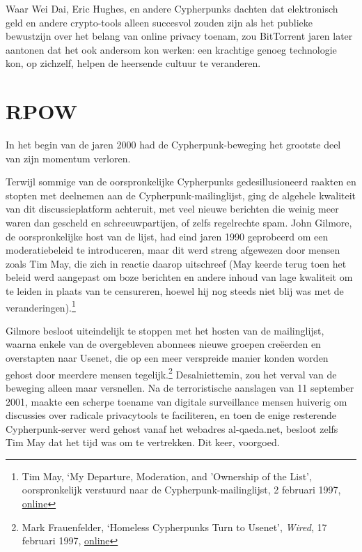 \documentclass[
  a5paper,
  smalldemyvopaper,11pt,twoside,onecolumn,openright,extrafontsizes]{memoir}
\begin{document}
Waar Wei Dai, Eric Hughes, en andere Cypherpunks dachten dat
elektronisch geld en andere crypto-tools alleen succesvol zouden zijn
als het publieke bewustzijn over het belang van online privacy toenam,
zou BitTorrent jaren later aantonen dat het ook andersom kon werken: een
krachtige genoeg technologie kon, op zichzelf, helpen de heersende
cultuur te veranderen.

\chapter{RPOW}\label{rpow}

In het begin van de jaren 2000 had de Cypherpunk-beweging het grootste
deel van zijn momentum verloren.

Terwijl sommige van de oorspronkelijke Cypherpunks gedesillusioneerd
raakten en stopten met deelnemen aan de Cypherpunk-mailinglijst, ging de
algehele kwaliteit van dit discussieplatform achteruit, met veel nieuwe
berichten die weinig meer waren dan gescheld en schreeuwpartijen, of
zelfs regelrechte spam. John Gilmore, de oorspronkelijke host van de
lijst, had eind jaren 1990 geprobeerd om een moderatiebeleid te
introduceren, maar dit werd streng afgewezen door mensen zoals Tim May,
die zich in reactie daarop uitschreef (May keerde terug toen het beleid
werd aangepast om boze berichten en andere inhoud van lage kwaliteit om
te leiden in plaats van te censureren, hoewel hij nog steeds niet blij
was met de veranderingen).\footnote{Tim May, `My Departure, Moderation,
  and 'Ownership of the List', oorspronkelijk verstuurd naar de
  Cypherpunk-mailinglijst, 2 februari 1997,
  \href{https://cypherpunks.venona.com/date/1997/02/msg02898.html}{online}}

Gilmore besloot uiteindelijk te stoppen met het hosten van de
mailinglijst, waarna enkele van de overgebleven abonnees nieuwe groepen
creëerden en overstapten naar Usenet, die op een meer verspreide manier
konden worden gehost door meerdere mensen tegelijk.\footnote{\hspace{0pt}Mark
  Frauenfelder, `Homeless Cypherpunks Turn to Usenet', \emph{Wired}, 17
  februari 1997,
  \href{https://www.wired.com/1997/02/homeless-cypherpunks-turn-to-usenet/}{online}}
Desalniettemin, zou het verval van de beweging alleen maar versnellen.
Na de terroristische aanslagen van 11 september 2001, maakte een scherpe
toename van digitale surveillance mensen huiverig om discussies over
radicale privacytools te faciliteren, en toen de enige resterende
Cypherpunk-server werd gehost vanaf het webadres al-qaeda.net, besloot
zelfs Tim May dat het tijd was om te vertrekken. Dit keer, voorgoed.
\end{document}
